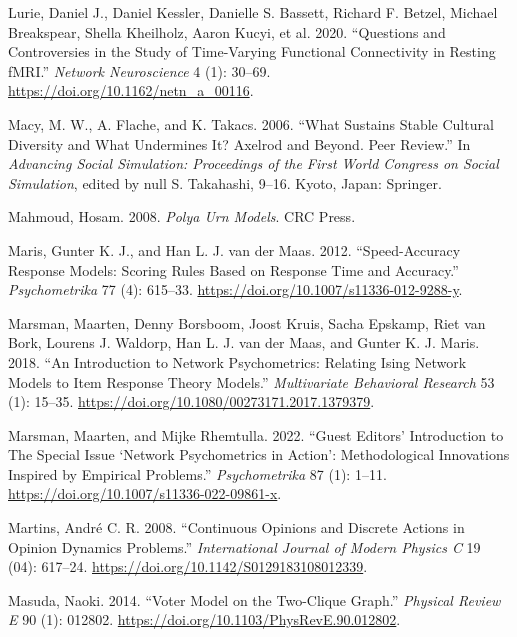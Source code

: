 \documentclass[
  a4paper,
  DIV=11,
  numbers=noendperiod,
  oneside]{scrreprt}
\newlength{\cslhangindent}
\newenvironment{CSLReferences}[2] %
 {\begin{list}{}{%
  \setlength{\itemindent}{0pt}
  \setlength{\leftmargin}{0pt}
  \setlength{\parsep}{0pt}
  \ifodd #1
   \setlength{\leftmargin}{\cslhangindent}
   \setlength{\itemindent}{-1\cslhangindent}
  \fi
  \setlength{\itemsep}{#2\baselineskip}}}
 {\end{list}}
\begin{document}
\begin{CSLReferences}{1}{0}
Lurie, Daniel J., Daniel Kessler, Danielle S. Bassett, Richard F.
Betzel, Michael Breakspear, Shella Kheilholz, Aaron Kucyi, et al. 2020.
{``Questions and Controversies in the Study of Time-Varying Functional
Connectivity in Resting {fMRI}.''} \emph{Network Neuroscience} 4 (1):
30--69. \url{https://doi.org/10.1162/netn_a_00116}.

Macy, M. W., A. Flache, and K. Takacs. 2006. {``What {Sustains Stable
Cultural Diversity} and {What Undermines It}? {Axelrod} and Beyond.
{Peer} Review.''} In \emph{Advancing {Social Simulation}: {Proceedings}
of the {First World Congress} on {Social Simulation}}, edited by null S.
Takahashi, 9--16. {Kyoto, Japan}: {Springer}.

Mahmoud, Hosam. 2008. \emph{Polya {Urn Models}}. {CRC Press}.

Maris, Gunter K. J., and Han L. J. van der Maas. 2012. {``Speed-Accuracy
Response Models: {Scoring} Rules Based on Response Time and Accuracy.''}
\emph{Psychometrika} 77 (4): 615--33.
\url{https://doi.org/10.1007/s11336-012-9288-y}.

Marsman, Maarten, Denny Borsboom, Joost Kruis, Sacha Epskamp, Riet van
Bork, Lourens J. Waldorp, Han L. J. van der Maas, and Gunter K. J.
Maris. 2018. {``An Introduction to Network Psychometrics: Relating Ising
Network Models to Item Response Theory Models.''} \emph{Multivariate
Behavioral Research} 53 (1): 15--35.
\url{https://doi.org/10.1080/00273171.2017.1379379}.

Marsman, Maarten, and Mijke Rhemtulla. 2022. {``Guest {Editors}'
{Introduction} to {The Special Issue} {`{Network Psychometrics} in
{Action}'}: {Methodological Innovations Inspired} by {Empirical
Problems}.''} \emph{Psychometrika} 87 (1): 1--11.
\url{https://doi.org/10.1007/s11336-022-09861-x}.

Martins, André C. R. 2008. {``Continuous Opinions and Discrete Actions
in Opinion Dynamics Problems.''} \emph{International Journal of Modern
Physics C} 19 (04): 617--24.
\url{https://doi.org/10.1142/S0129183108012339}.

Masuda, Naoki. 2014. {``Voter Model on the Two-Clique Graph.''}
\emph{Physical Review E} 90 (1): 012802.
\url{https://doi.org/10.1103/PhysRevE.90.012802}.


\end{CSLReferences}
\end{document}
